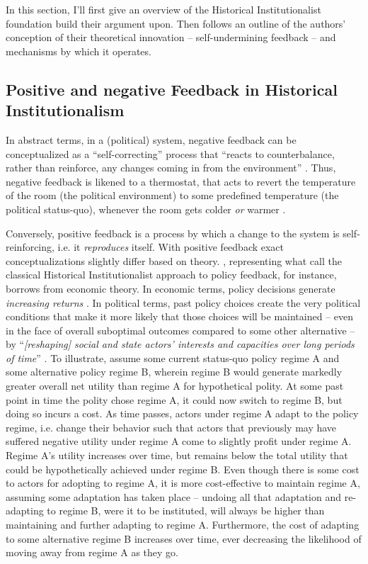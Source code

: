 \documentclass[11pt]{article}
\begin{document}
In this section, I'll first give an overview of the Historical Institutionalist foundation \textcite[][]{Jacobs2014} build their argument upon. Then follows an outline of the authors' conception of their theoretical innovation -- self-undermining feedback -- and mechanisms by which it operates.

\subsection*{Positive and negative Feedback in Historical Institutionalism}

In abstract terms, in a (political) system, negative feedback can be conceptualized as a \enquote{self-correcting} \parencite[][p. 8]{Baumgartner2002} process that \enquote{reacts to counterbalance, rather than reinforce, any changes coming in from the environment} . Thus, negative feedback is likened to a thermostat, that acts to revert the temperature of the room (the political environment) to some predefined temperature (the political status-quo), whenever the room gets colder \textit{or} warmer \parencite[][]{Wlezien1995}.

Conversely, positive feedback is a process by which a change to the system is self-reinforcing, i.e. it \textit{reproduces} itself. With positive feedback exact conceptualizations slightly differ based on theory. \textcite{Pierson2000}, representing what \textcite{Jacobs2014} call the classical Historical Institutionalist approach to policy feedback, for instance, borrows from economic theory. In economic terms, policy decisions generate \textit{increasing returns} \parencite[for economic discussion see][]{Arthur1994}. In political terms, past policy choices create the very political conditions that make it more likely that those choices will be maintained -- even in the face of overall suboptimal outcomes compared to some other alternative -- by \enquote{\textit{[reshaping] social and state actors' interests and capacities over long periods of time}} \parencite[][p. 443, original emphasis]{Jacobs2014}. To illustrate, assume some current status-quo policy regime A and some alternative policy regime B, wherein regime B would generate markedly greater overall net utility than regime A for hypothetical polity. At some past point in time the polity chose regime A, it could now switch to regime B, but doing so incurs a cost. As time passes, actors under regime A adapt to the policy regime, i.e. change their behavior such that actors that previously may have suffered negative utility under regime A come to slightly profit under regime A. Regime A's utility increases over time, but remains below the total utility that could be hypothetically achieved under regime B. Even though there is some cost to actors for adopting to regime A, it is more cost-effective to maintain regime A, assuming some adaptation has taken place -- undoing all that adaptation and re-adapting to regime B, were it to be instituted, will always be higher than maintaining and further adapting to regime A. Furthermore, the cost of adapting to some alternative regime B increases over time, ever decreasing the likelihood of moving away from regime A as they go.
\end{document}

